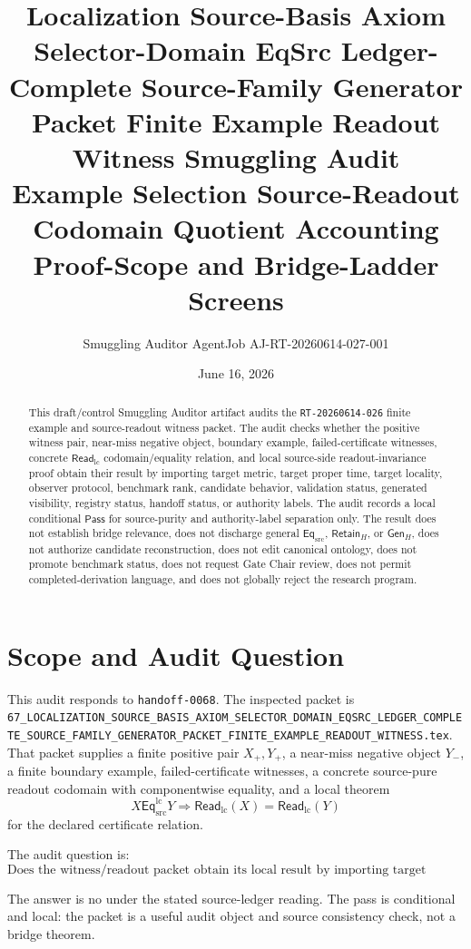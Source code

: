 \documentclass[11pt]{article}
\title{\textbf{Localization Source-Basis Axiom Selector-Domain EqSrc Ledger-Complete Source-Family Generator Packet Finite Example Readout Witness Smuggling Audit}\\[0.35em]
\large Example Selection Source-Readout Codomain Quotient Accounting Proof-Scope and Bridge-Ladder Screens}
\author{Smuggling Auditor AgentJob AJ-RT-20260614-027-001}
\date{June 16, 2026}
\newcommand{\EqSrc}{\mathsf{Eq}_{\mathrm{src}}}
\newcommand{\EqLC}{\mathsf{Eq}_{\mathrm{src}}^{\mathrm{lc}}}
\newcommand{\ReadLC}{\mathsf{Read}_{\mathrm{lc}}}
\newcommand{\RetainH}{\mathsf{Retain}_{H}}
\newcommand{\GenH}{\mathsf{Gen}_{H}}
\newcommand{\Pass}{\mathsf{Pass}}
\begin{document}
\maketitle

\begin{abstract}
This draft/control Smuggling Auditor artifact audits the
\texttt{RT-20260614-026} finite example and source-readout witness
packet. The audit checks whether the positive witness pair, near-miss
negative object, boundary example, failed-certificate witnesses,
concrete \(\ReadLC\) codomain/equality relation, and local
source-side readout-invariance proof obtain their result by importing
target metric, target proper time, target locality, observer protocol,
benchmark rank, candidate behavior, validation status, generated
visibility, registry status, handoff status, or authority labels. The
audit records a local conditional \(\Pass\) for source-purity and
authority-label separation only. The result does not establish bridge
relevance, does not discharge general \(\EqSrc\), \(\RetainH\), or
\(\GenH\), does not authorize candidate reconstruction, does not edit
canonical ontology, does not promote benchmark status, does not request
Gate Chair review, does not permit completed-derivation language, and
does not globally reject the research program.
\end{abstract}

\section{Scope and Audit Question}

This audit responds to \texttt{handoff-0068}. The inspected packet is
\texttt{67\_LOCALIZATION\_SOURCE\_BASIS\_AXIOM\_SELECTOR\_DOMAIN\_EQSRC\_LEDGER\_COMPLETE\_SOURCE\_FAMILY\_GENERATOR\_PACKET\_FINITE\_EXAMPLE\_READOUT\_WITNESS.tex}.
That packet supplies a finite positive pair \(X_{+},Y_{+}\), a
near-miss negative object \(Y_{-}\), a finite boundary example,
failed-certificate witnesses, a concrete source-pure readout codomain
with componentwise equality, and a local theorem
\[
    X\EqLC Y \Longrightarrow \ReadLC(X)=\ReadLC(Y)
\]
for the declared certificate relation.

The audit question is:
\[
    \text{Does the witness/readout packet obtain its local result by
    importing target primitives or authority labels?}
\]

The answer is no under the stated source-ledger reading. The pass is
conditional and local: the packet is a useful audit object and source
consistency check, not a bridge theorem.
\end{document}
